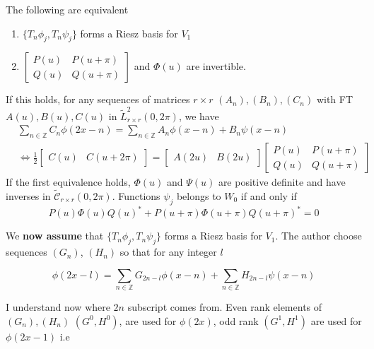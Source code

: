 \documentclass[a4paper, 11pt]{article}
\begin{document}
\begin{thm}{2.1}
  The following are equivalent
  \begin{enumerate}
    \item $\{T_n \phi_j, T_n \psi_j\}$ forms a Riesz basis for $V_1$
    \item $\begin{bmatrix} P(u) & P(u+\pi) \\ Q(u) & Q(u+\pi) \end{bmatrix}$ and $\Phi(u)$ are invertible.  
  \end{enumerate}
  If this holds, for any sequences of matrices $r\times r$ $(A_n), (B_n), (C_n)$ with FT $A(u), B(u), C(u)$ in 
  $\tilde{L}^2_{r\times r}(0, 2\pi)$, we have
  \begin{align}
    &\sum_{n \in \mathbb{Z}} C_n \phi(2x-n) = \sum_{n \in \mathbb{Z}} A_n \phi(x-n) + B_n \psi(x-n) \\
    & \iff \frac{1}{2} \begin{bmatrix} C(u) & C(u+2\pi) \end{bmatrix} = \begin{bmatrix} A(2u) & B(2u) 
    \end{bmatrix}\begin{bmatrix} P(u) & P(u+\pi) \\ Q(u) & Q(u+\pi) \end{bmatrix}
    \end{align}
  If the first equivalence holds, $\Phi(u)$ and $\Psi(u)$ are positive definite and have inverses in 
  $\tilde{\mathcal{C}}_{r\times r}(0, 2\pi)$.  Functions $\psi_j$ belongs to $W_0$ if and only if
  \begin{equation}
     P(u) \Phi(u) {Q(u)}^* + P(u+\pi) \Phi(u+\pi) {Q(u+\pi)}^* = 0
  \end{equation}
\end{thm}

We \textbf{now assume} that $\{T_n \phi_j, T_n \psi_j\}$ forms a Riesz basis for $V_1$. The author choose sequences 
$(G_n)$, $(H_n)$ so that for any integer $l$

\begin{equation}
  \phi(2x-l) = \sum_{n \in \mathbb{Z}} G_{2n-l} \phi(x-n) + \sum_{n \in \mathbb{Z}} H_{2n-l} \psi(x-n)
\end{equation}

I understand now where $2n$ subscript comes from. Even rank elements of $(G_n), (H_n)$ $(G^0, H^0)$, are used for 
$\phi(2x)$, odd rank $(G^1, H^1)$ are used for $\phi(2x-1)$ i.e
\end{document}
